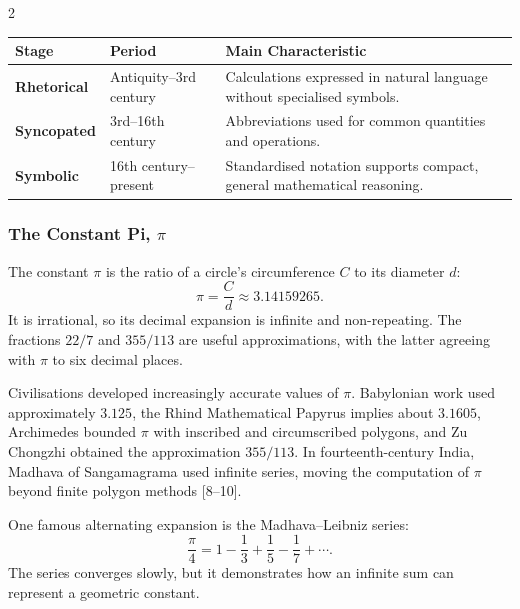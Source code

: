 \begin{multicols}{2}
\begin{center}
\vspace{-0.5em}
\begin{minipage}{0.98\columnwidth}
\centering
    \scriptsize
    \setlength{\tabcolsep}{2pt}
    \renewcommand{\arraystretch}{1.3}
    \begin{tabular}{@{}>{\bfseries\RaggedRight\arraybackslash}p{}
                        >{\Centering\arraybackslash}p{}
                        >{\RaggedRight\arraybackslash}p{}@{}}
      \toprule
      \textbf{Stage} & \textbf{Period} & \textbf{Main Characteristic} \\
      \midrule
      Rhetorical & Antiquity--3rd century & Calculations expressed in natural language without specialised symbols. \\
      Syncopated & 3rd--16th century & Abbreviations used for common quantities and operations. \\
      Symbolic & 16th century--present & Standardised notation supports compact, general mathematical reasoning. \\
      \bottomrule
    \end{tabular}
\end{minipage}
  \end{center}
\vspace{-0.35em}
  \subsubsection*{The Constant Pi, $\pi$}
  The constant $\pi$ is the ratio of a circle's circumference $C$ to its diameter $d$:
  \[
    \pi=\frac{C}{d}\approx3.14159265.
  \]
  It is irrational, so its decimal expansion is infinite and non-repeating. The fractions $22/7$ and $355/113$ are useful approximations, with the latter agreeing with $\pi$ to six decimal places.

  \noindent
  Civilisations developed increasingly accurate values of $\pi$. Babylonian work used approximately $3.125$, the Rhind Mathematical Papyrus implies about $3.1605$, Archimedes bounded $\pi$ with inscribed and circumscribed polygons, and Zu Chongzhi obtained the approximation $355/113$. In fourteenth-century India, Madhava of Sangamagrama used infinite series, moving the computation of $\pi$ beyond finite polygon methods [8--10].

  One famous alternating expansion is the Madhava--Leibniz series:
  \[
    \frac{\pi}{4}=1-\frac{1}{3}+\frac{1}{5}-\frac{1}{7}+\cdots.
  \]
  The series converges slowly, but it demonstrates how an infinite sum can represent a geometric constant.


\end{multicols}
